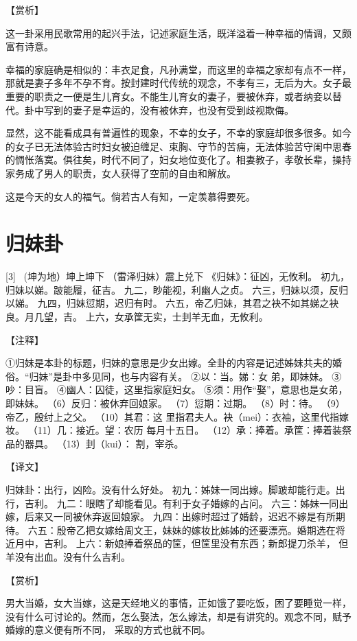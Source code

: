 \documentclass[12pt,UTF8]{ctexbook}
\begin{document}
【赏析】

这一卦采用民歌常用的起兴手法，记述家庭生活，既洋溢着一种幸福的情调，又颇富有诗意。

幸福的家庭确是相似的：丰衣足食，凡孙满堂，而这里的幸福之家却有点不一样，那就是妻子多年不孕不育。按封建时代传统的观念，不孝有三，无后为大。女子最重要的职责之一便是生儿育女。不能生儿育女的妻子，要被休弃，或者纳妾以替代。卦中写到的妻子是幸运的，没有被休弃，也没有受到歧视欺侮。

显然，这不能看成具有普遍性的现象，不幸的女子，不幸的家庭却很多很多。如今的女子已无法体验古时妇女被迫缠足、束胸、守节的苦痈，无法体验苦守闺中思春的惆怅落寞。俱往矣，时代不同了，妇女地位变化了。相妻教子，孝敬长辈，操持家务成了男人的职责，女人获得了空前的自由和解放。

这是今天的女人的福气。倘若古人有知，一定羡慕得要死。

\chapter{归妹卦}
[3] \ (坤为地）坤上坤下
（雷泽归妹）震上兑下
《归妹》：征凶，无攸利。
初九，归妹以娣。跛能履，征吉。
九二，眇能视，利幽人之贞。
六三，归妹以须，反归以娣。
九四，归妹愆期，迟归有时。
六五，帝乙归妹，其君之袂不如其娣之袂良。月几望，吉。
上六，女承筐无实，士刲羊无血，无攸利。

【注释】

①归妹是本卦的标题，归妹的意思是少女出嫁。全卦的内容是记述姊妹共夫的婚俗。“归妹”是卦中多见同，也与内容有关。
②以：当。娣：女 弟，即妹妹。
③吵：目盲。
④幽人：囚徒，这里指家庭妇女。
⑤须：用作“娶”，意思也是女弟，即妹妹。
（6）反归：被休弃回娘家。
（7）愆期：过期。
（8）时：待。
（9）帝乙，殷纣上之父。
（10）其君：这 里指君夫人。袂（mei）：衣袖，这里代指嫁妆。
（11）几：接近。望：农历 每月十五日。
（12）承：捧着。承筐：捧着装祭品的器具。
（13）刲（kui）： 割，宰杀。

【译文】

归妹卦：出行，凶险。没有什么好处。
初九：姊妹一同出嫁。脚跛却能行走。出行，吉利。
九二：眼瞎了却能看见。有利于女子婚嫁的占问。
六三：姊妹一同出嫁，后来又一同被休弃返回娘家。
九四：出嫁时超过了婚龄，迟迟不嫁是有所期待。
六五：殷帝乙把女嫁给周文王，妹妹的嫁妆比姊姊的还要漂亮。婚期选在将近月中，吉利。
上六：新娘捧着祭品的筐，但筐里没有东西；新郎提刀杀羊， 但羊没有出血。没有什么吉利。

【赏析】

男大当婚，女大当嫁，这是天经地义的事情，正如饿了要吃饭，困了要睡觉一样，没有什么可讨论的。然而，怎么娶法，怎么嫁法，却是有讲究的。观念不同，赋予婚嫁的意义便有所不同， 采取的方式也就不同。
\end{document}
